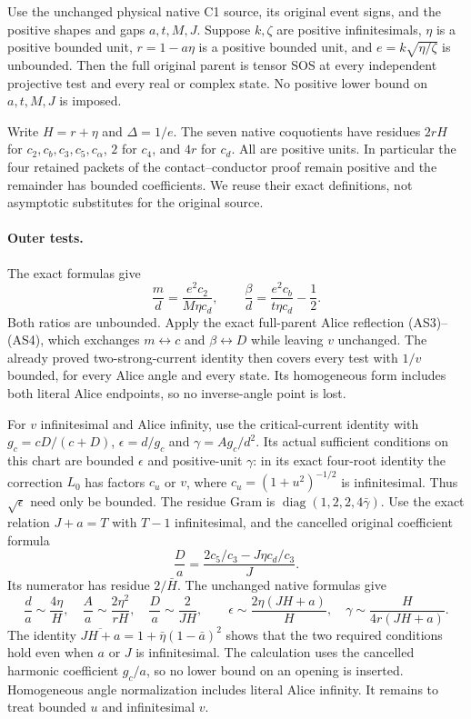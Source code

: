 \begin{theorem}
Use the unchanged physical native C1 source, its original event signs,
and the positive shapes and gaps $a,t,M,J$. Suppose $k,\zeta$ are
positive infinitesimals, $\eta$ is a positive bounded unit,
$r=1-a\eta$ is a positive bounded unit, and $e=k\sqrt{\eta/\zeta}$
is unbounded. Then the full original parent is tensor SOS at every
independent projective test and every real or complex state.
No positive lower bound on $a,t,M,J$ is imposed.
\end{theorem}

Write $H=r+\eta$ and $\Delta=1/e$. The seven native coquotients
have residues $2rH$ for $c_2,c_b,c_3,c_5,c_\alpha$, $2$ for
$c_4$, and $4r$ for $c_d$. All are positive units. In particular the
four retained packets of the contact--conductor proof remain positive
and the remainder has bounded coefficients. We reuse their exact
definitions, not asymptotic substitutes for the original source.

\paragraph{Outer tests.}
The exact formulas give
\[
 \frac md=\frac{e^2c_2}{M\eta c_d},\qquad
 \frac\beta d=\frac{e^2c_b}{t\eta c_d}-\frac12.
\]
Both ratios are unbounded. Apply the exact full-parent Alice reflection
(AS3)--(AS4), which exchanges $m\leftrightarrow c$ and
$\beta\leftrightarrow D$ while leaving $v$ unchanged. The already
proved two-strong-current identity then covers every test with $1/v$
bounded, for every Alice angle and every state. Its homogeneous form
includes both literal Alice endpoints, so no inverse-angle point is lost.

For $v$ infinitesimal and Alice infinity, use the critical-current
identity with $g_c=cD/(c+D)$, $\epsilon=d/g_c$ and
$\gamma=Ag_c/d^2$. Its actual sufficient conditions on this chart
are bounded $\epsilon$ and positive-unit $\gamma$: in its exact
four-root identity the correction $L_0$ has factors $c_u$ or $v$,
where $c_u=(1+u^2)^{-1/2}$ is infinitesimal. Thus $\sqrt\epsilon$
need only be bounded. The residue Gram is
$\operatorname{diag}(1,2,2,4\bar\gamma)$.
Use the exact relation $J+a=T$ with $T-1$ infinitesimal, and the
cancelled original coefficient formula
\[
 \frac Da=\frac{2c_5/c_3-J\eta c_d/c_3}{J}.
\]
Its numerator has residue $2/\bar H$. The unchanged native formulas give
\[
 \frac d a\sim\frac{4\eta}{H},\quad
 \frac A a\sim\frac{2\eta^2}{rH},\quad
 \frac D a\sim\frac2{JH},\qquad
 \epsilon\sim\frac{2\eta(JH+a)}H,\quad
 \gamma\sim\frac{H}{4r(JH+a)}.
\]
The identity
$\overline{JH+a}=1+\bar\eta(1-\bar a)^2$ shows that the two required
conditions hold even when $a$ or $J$ is infinitesimal. The calculation
uses the cancelled harmonic coefficient $g_c/a$, so no lower bound
on an opening is inserted. Homogeneous angle normalization includes
literal Alice infinity. It remains to treat bounded $u$ and
infinitesimal $v$.


